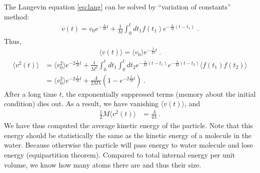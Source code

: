 {{    }
    The Langevin equation \eqref{eq:lang} can be solved by ``variation of constants'' method:
    \begin{align}
        \label{eq:sol_lang}
        v(t) = v_0 e^{-\frac{\lambda}{M} t}
        + \frac{1}{M}  \int_0^{t} dt_1 f(t_1) e^{-\frac{\lambda}{M}(t-t_1)} ~.      
    \end{align} 
    Thus,
    \begin{align}
        \langle v(t) \rangle = \langle v_0 \rangle e^{-\frac{\lambda}{M} t}~.
    \end{align}
    \begin{align}
        \label{eq:lang_v2}
        \langle v^2(t) \rangle & = \langle v_0^2 \rangle e^{-2\frac{\lambda}{M} t}
        + \frac{1}{M^2} \int_0^t dt_1 \int_0^t dt_2 
        e^{-\frac{\lambda}{M}(t-t_1)} e^{-\frac{\lambda}{M}(t-t_2)}
        \langle f(t_1) f(t_2) \rangle
        \nonumber\\ &
        = \langle v_0^2 \rangle e^{-2\frac{\lambda}{M} t}
        + \frac{\Lambda}{2M\lambda} \left ( 1-e^{-2\frac{\lambda}{M} t} \right )~. 
    \end{align}
    After a long time $t$, the exponentially suppressed terms (memory about the initial condition) dies out. As a result, we have vanishing $\langle v(t) \rangle$, and 
    \begin{align}
    \label{eq:lang_v2_infty}
        \frac{1}{2}  M\langle v^2(t) \rangle & = \frac{\Lambda}{4\lambda}~. 
    \end{align}
    We have thus computed the average kinetic energy of the particle. Note that this energy should be statistically the same as the kinetic energy of a molecule in the water. Because otherwise the particle will pass energy to water molecule and lose energy (equipartition theorem). Compared to total internal energy per unit volume, we know how many atoms there are and thus their size. 
}

